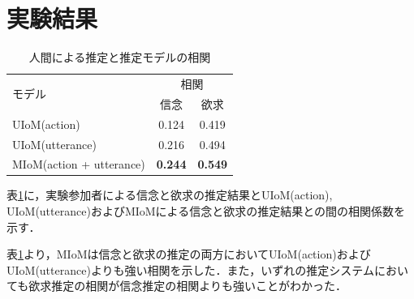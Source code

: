 \section{実験結果}

\begin{table}[htb]
  \begin{center}
  \caption{人間による推定と推定モデルの相関}
  \label{tab:cof}
  \begin{tabular}{lcc} \hline
    \multirow{2}{*}{モデル}&\multicolumn{2}{c}{相関}\\\cline{2-3}
    & \hspace{10pt} 信念 \hspace{10pt} & \hspace{10pt} 欲求 \hspace{10pt} \\ \hline
    UIoM(action)&0.124&0.419\\
    UIoM(utterance)&0.216&0.494\\
    MIoM(action + utterance)&\bf0.244&\bf0.549 \\\hline
  \end{tabular}
\end{center}
\end{table}


\par
表\ref{tab:cof}に，実験参加者による信念と欲求の推定結果とUIoM(action), UIoM(utterance)およびMIoMによる信念と欲求の推定結果との間の相関係数を示す．

\par
表\ref{tab:cof}より，MIoMは信念と欲求の推定の両方においてUIoM(action)およびUIoM(utterance)よりも強い相関を示した．また，いずれの推定システムにおいても欲求推定の相関が信念推定の相関よりも強いことがわかった．
